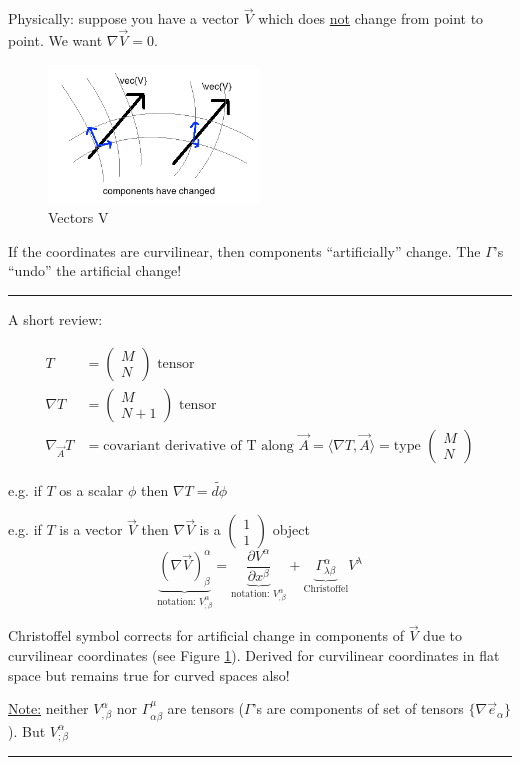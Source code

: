\documentclass[a4paper]{article} %
\newcommand{\review}[1]
{
\hrule
A short review:

#1
\hrule
}
\newcommand{\pmx}[1]{
\begin{pmatrix}
#1
\end{pmatrix}
}
\renewcommand{\tilde}{\widetilde}
\begin{document}
Physically: suppose you have a vector $\vec{V}$ which does \underline{not} change from point to point. We want $\nabla \vec{V}=0$.

\begin{figure}[h]
\centering
\includegraphics[width=0.5\textwidth]{images/vectors-v.png}
\caption{Vectors V}
\label{Christoffel image}
\end{figure}

If the coordinates are curvilinear, then components ``artificially'' change. The $\Gamma$'s ``undo'' the artificial change!


\review{
\begin{align*}
T&=\pmx{M\\N}\text{ tensor}\\
\nabla T&=\pmx{M\\N+1}\text{ tensor}\\
\nabla_{\vec{A}}T&=\text{covariant derivative of T along }\vec{A}=\langle\nabla T,\vec{A}\rangle=\text{type }\pmx{M\\N}
\end{align*}

e.g. if $T$ os a scalar $\phi$ then $\nabla T=\tilde{d\phi}$

e.g. if $T$ is a vector $\vec{V}$ then $\nabla \vec{V}$ is a $\pmx{1\\1}$ object
\begin{equation}
\underbrace{(\nabla \vec{V})^{\alpha}_{\beta}}_{\text{notation: }V^{\alpha}_{;\beta}}=
\underbrace{\frac{\partial V^{\alpha}}{\partial x^{\beta}}}_{\text{notation: }V^{\alpha}_{,\beta}}
+\underbrace{\Gamma^{\alpha}_{\lambda\beta}}_{\text{Christoffel}}V^{\lambda}
\end{equation}

Christoffel symbol corrects for artificial change in components of $\vec{V}$ due to curvilinear coordinates (see Figure \ref{Christoffel image}). Derived for curvilinear coordinates in flat space but remains true for curved spaces also!

\underline{Note:} neither $V^{\alpha}_{,\beta}$ nor $\Gamma^{\mu}_{\alpha\beta}$ are tensors ($\Gamma$'s are components of set of tensors $\{\nabla \vec{e}_{\alpha}\}$). But $V^{\alpha}_{;\beta}$
}
\end{document}
